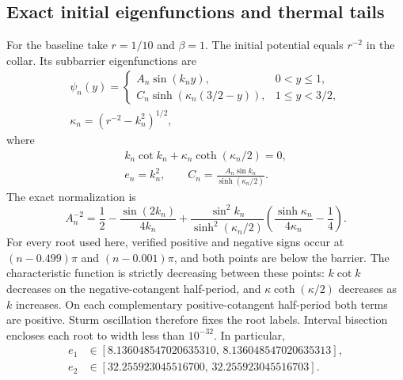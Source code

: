 \documentclass[aps,pra,reprint,superscriptaddress,longbibliography]{revtex4-2}
\begin{document}
\subsection{Exact initial eigenfunctions and thermal tails}

For the baseline take $r=1/10$ and $\beta=1$.
The initial potential equals $r^{-2}$ in the collar.  Its subbarrier
eigenfunctions are
\begin{equation}
 \begin{gathered}
 \psi_n(y)=
 \begin{cases}
 A_n\sin(k_n y),&0<y\le1,\\
 C_n\sinh\!\left(\kappa_n(3/2-y)\right),&1\le y<3/2,
 \end{cases}
 \\
 \kappa_n=(r^{-2}-k_n^2)^{1/2},
 \end{gathered}
 \label{eq:nc-initial}
\end{equation}
where
\begin{equation}
 \begin{gathered}
 k_n\cot k_n+\kappa_n\coth(\kappa_n/2)=0,
 \\e_n=k_n^2,\qquad
 C_n=\frac{A_n\sin k_n}{\sinh(\kappa_n/2)}.
 \end{gathered}
 \label{eq:nc-root}
\end{equation}
The exact normalization is
\begin{equation}
 A_n^{-2}=\frac12-\frac{\sin(2k_n)}{4k_n}
 +\frac{\sin^2 k_n}{\sinh^2(\kappa_n/2)}
 \left(\frac{\sinh\kappa_n}{4\kappa_n}-\frac14\right).
 \label{eq:nc-normalization}
\end{equation}
For every root used here, verified positive and negative signs occur at
$(n-0.499)\pi$ and $(n-0.001)\pi$, and both points are below the barrier.
The characteristic function is strictly decreasing between these points:
$k\cot k$ decreases on the negative-cotangent half-period, and
$\kappa\coth(\kappa/2)$ decreases as $k$ increases.
On each complementary positive-cotangent half-period both terms are
positive.  Sturm oscillation therefore fixes the root labels.
Interval bisection encloses each root to width less than $10^{-32}$.
In particular,
\begin{align}
 e_1&\in[8.136048547020635310,\,
          8.136048547020635313],\nonumber\\
 e_2&\in[32.255923045516700,\,
          32.255923045516703].
 \label{eq:nc-initial-values}
\end{align}
\end{document}
